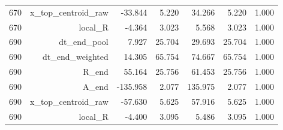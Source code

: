 \begin{tabular}{lrrrrrr}
670 & x_top_centroid_raw & -33.844 & 5.220 & 34.266 & 5.220 & 1.000 \\
670 & local_R & -4.364 & 3.023 & 5.568 & 3.023 & 1.000 \\
690 & dt_end_pool & 7.927 & 25.704 & 29.693 & 25.704 & 1.000 \\
690 & dt_end_weighted & 14.305 & 65.754 & 74.667 & 65.754 & 1.000 \\
690 & R_end & 55.164 & 25.756 & 61.453 & 25.756 & 1.000 \\
690 & A_end & -135.958 & 2.077 & 135.975 & 2.077 & 1.000 \\
690 & x_top_centroid_raw & -57.630 & 5.625 & 57.916 & 5.625 & 1.000 \\
690 & local_R & -4.400 & 3.095 & 5.486 & 3.095 & 1.000 \\
\end{tabular}
